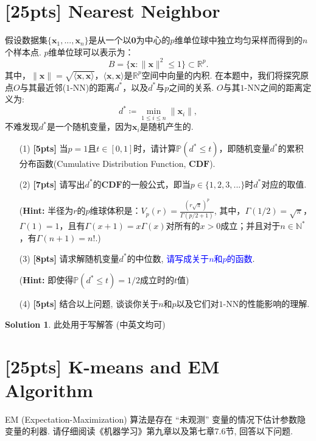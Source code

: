 \documentclass[a4paper,UTF8]{article}
\numberwithin{equation}{section}
\theoremstyle{definition}
\newtheorem*{solution}{Solution}
\begin{document}
\section{[25pts] Nearest Neighbor}
假设数据集$\{\mathbf{x}_1,...,\mathbf{x}_n\}$是从一个以$\mathbf{0}$为中心的$p$维单位球中独立均匀采样而得到的$n$个样本点. $p$维单位球可以表示为：
\begin{equation}
	B = \{\mathbf{x}: \lVert \mathbf{x} \rVert^2 \leq 1\} \subset \mathbb{R}^p.
\end{equation}
其中，$\lVert \mathbf{x} \rVert= \sqrt{\langle\mathbf{x}, \mathbf{x}\rangle}$，$\langle\mathbf{x}, \mathbf{x}\rangle$是$\mathbb{R}^p$空间中向量的内积.
在本题中，我们将探究原点$O$与其最近邻($1$-NN)的距离$d^*$，以及$d^*$与$p$之间的关系. $O$与其$1$-NN之间的距离定义为:
\begin{equation}
d^* \coloneqq \min_{1\leq i \leq n} \lVert \mathbf{x}_i \rVert,
\end{equation}
不难发现$d^*$是一个随机变量，因为$\mathbf{x}_i$是随机产生的.
\begin{enumerate}
\item[(1)] \textbf{[5pts]} 当$p=1$且$t\in [0,1]$时，请计算$\mathbb{P}(d^*\leq t)$，即随机变量$d^*$的累积分布函数(Cumulative Distribution Function, $\mathbf{CDF}$).
\item[(2)] \textbf{[7pts]} 请写出$d^*$的$\mathbf{CDF}$的一般公式，即当$p\in\{1,2,3,...\}$时$d^*$对应的取值. 

(\textbf{Hint:} 半径为$r$的$p$维球体积是：$V_p(r)=\frac{(r\sqrt{\pi})^p}{\Gamma(p/2+1)}$, 
	其中，$\Gamma(1/2)=\sqrt{\pi}$，$\Gamma(1)=1$，且有$\Gamma(x+1)=x\Gamma(x)$对所有的$x>0$成立；并且对于$n\in\mathbb{N}^*$，有$\Gamma(n+1)=n!$.)
\item[(3)] \textbf{[8pts]} 请求解随机变量$d^*$的中位数,  \textcolor{blue}{请写成关于$n$和$p$的函数}.

(\textbf{Hint:} 即使得$\mathbb{P}(d^*\leq t)=1/2$成立时的$t$值)
\item[(4)] \textbf{[5pts]} 结合以上问题, 谈谈你关于$n$和$p$以及它们对$1$-NN的性能影响的理解.
\end{enumerate}

\begin{solution}
    此处用于写解答 (中英文均可)
    ~\\
\end{solution}

\newpage

\section{[25pts] K-means and EM Algorithm}
EM (Expectation-Maximization) 算法是存在 “未观测” 变量的情况下估计参数隐变量的利器. 
请仔细阅读《机器学习》第九章以及第七章7.6节, 回答以下问题.
\end{document}
